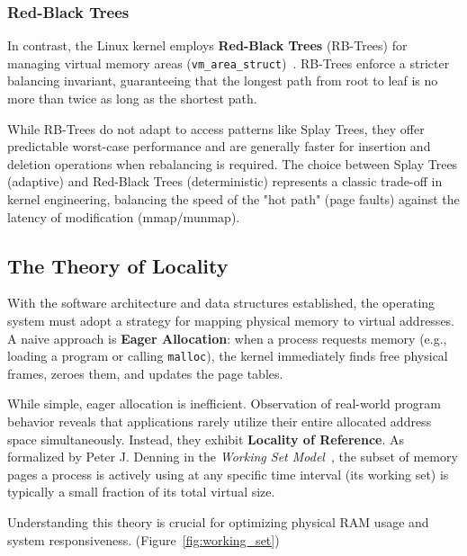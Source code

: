 \documentclass[a4paper,10pt,twoside]{report}
\theoremstyle{definition}
\begin{document}
\subsubsection{Red-Black Trees}

In contrast, the Linux kernel employs \textbf{Red-Black Trees} (RB-Trees) for managing virtual memory areas (\texttt{vm\_area\_struct})~\cite{gorman2004understanding}. RB-Trees enforce a stricter balancing invariant, guaranteeing that the longest path from root to leaf is no more than twice as long as the shortest path. 

While RB-Trees do not adapt to access patterns like Splay Trees, they offer predictable worst-case performance and are generally faster for insertion and deletion operations when rebalancing is required. The choice between Splay Trees (adaptive) and Red-Black Trees (deterministic) represents a classic trade-off in kernel engineering, balancing the speed of the "hot path" (page faults) against the latency of modification (mmap/munmap).

\subsection{The Theory of Locality}
\label{subsec:vmm_locality}

With the software architecture and data structures established, the operating system must adopt a strategy for mapping physical memory to virtual addresses. A naive approach is \textbf{Eager Allocation}: when a process requests memory (e.g., loading a program or calling \texttt{malloc}), the kernel immediately finds free physical frames, zeroes them, and updates the page tables.

While simple, eager allocation is inefficient. Observation of real-world program behavior reveals that applications rarely utilize their entire allocated address space simultaneously. Instead, they exhibit \textbf{Locality of Reference}. As formalized by Peter J. Denning in the \textit{Working Set Model}~\cite{denning1968working}, the subset of memory pages a process is actively using at any specific time interval (its working set) is typically a small fraction of its total virtual size.

Understanding this theory is crucial for optimizing physical RAM usage and system responsiveness. (Figure~\ref{fig:working_set})
\end{document}
